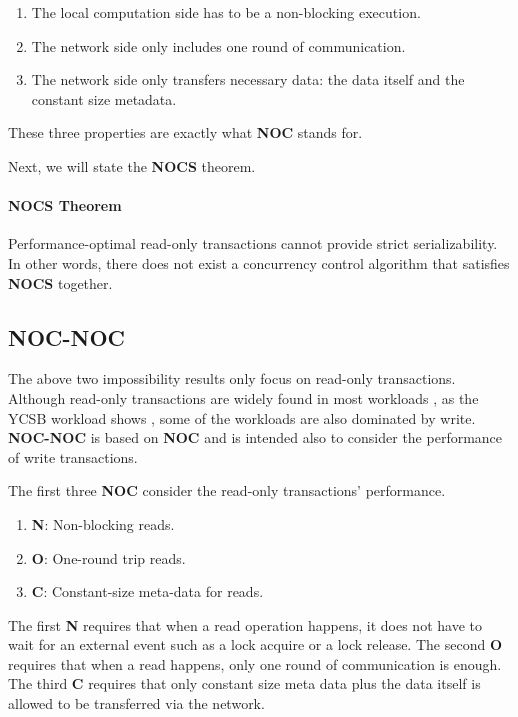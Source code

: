 \begin{enumerate}
    \item The local computation side has to be a non-blocking execution.
    \item The network side only includes one round of communication.
    \item The network side only transfers necessary data: the data itself and the constant size metadata. 
\end{enumerate}

These three properties are exactly what \textbf{NOC} stands for.


Next, we will state the \textbf{NOCS} theorem.

\paragraph{NOCS Theorem} Performance-optimal read-only transactions cannot provide strict serializability. In other words, there does not exist a concurrency control algorithm that satisfies \textbf{NOCS} together.




\subsection{NOC-NOC}

The above two impossibility results only focus on read-only transactions. Although read-only transactions are widely found in most workloads \cite{cooper2010benchmarking}, as the YCSB workload shows \cite{cooper2010benchmarking}, some of the workloads are also dominated by write.  \textbf{NOC-NOC} is based on \textbf{NOC} and is intended also to consider the performance of write transactions.


The first three \textbf{NOC} consider the read-only transactions' performance.


\begin{enumerate}
    \item \textbf{N}: Non-blocking reads. 
    \item \textbf{O}: One-round trip reads.
    \item \textbf{C}: Constant-size meta-data for reads.
\end{enumerate}


The first \textbf{N} requires that when a read operation happens, it does not have to wait for an external event such as a lock acquire or a lock release. The second \textbf{O} requires that when a read happens, only one round of communication is enough. The third \textbf{C} requires that only constant size meta data plus the data itself is allowed to be transferred via the network.

